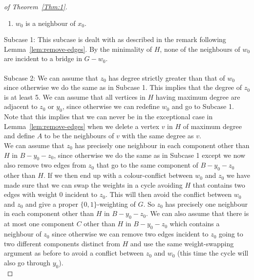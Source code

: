 \documentclass[
final,
 nomarks,
]{dmtcs-episciences}
\theoremstyle{definition}
\begin{document}
\begin{proof}[of Theorem~\ref{Thm:1}]
\begin{enumerate}
\item $w_0$ is a neighbour of $x_0$.
\end{enumerate} 
Subcase 1: This subcase is dealt with as described in the remark following Lemma~\ref{lem:remove-edges}. By the minimality of $H$, none of the neighbours of $w_0$ are incident to a bridge in $G-w_0$.   \\ \\
Subcase 2: We can assume that $z_0$ has degree strictly greater than that of $w_0$ since otherwise we do the same as in Subcase 1. This implies that the degree of $z_0$ is at least 5. We can assume that all vertices in $H$ having maximum degree are adjacent to $z_0$ or $y_0$, since otherwise we can redefine $w_0$ and go to Subcase 1. Note that this implies that we can never be in the exceptional case in Lemma~\ref{lem:remove-edges} when we delete a vertex $v$ in $H$ of maximum degree and define $A$ to be the neighbours of $v$ with the same degree as $v$.  \\ 
We can assume that $z_0$ has precisely one neighbour in each component other than $H$ in $B-y_0-z_0$, since otherwise we do the same as in Subcase 1 except we now also remove two edges from $z_0$ that go to the same component of $B-y_0-z_0$ other than $H$. If we then end up with a colour-conflict between $w_0$ and $z_0$ we have made sure that we can swap the weights in a cycle avoiding $H$ that contains two edges with weight 0 incident to $z_0$. This will then avoid the conflict between $w_0$ and $z_0$ and give a proper $\{0,1\}$-weighting of $G$. So $z_0$ has precisely one neighbour in each component other than $H$ in $B-y_0-z_0$. We can also assume that there is at most one component $C$ other than $H$ in $B-y_0-z_0$ which contains a neighbour of $z_0$ since otherwise we can remove two edges incident to $z_0$ going to two different components distinct from $H$ and use the same weight-swapping argument as before to avoid a conflict between $z_0$ and $w_0$ (this time the cycle will also go through $y_0$). \\

\end{proof}
\end{document}

